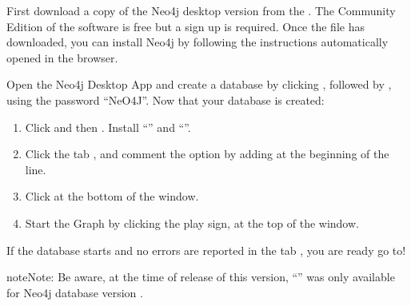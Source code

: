 \documentclass[letterpaper,10pt,english]{sphinxmanual}
\begin{document}
First download a copy of the Neo4j desktop version from the .
The Community Edition of the software is free but a sign up is required.
Once the file has downloaded, you can install Neo4j by following the instructions automatically opened in the browser.

\noindent{}

\noindent{}

\noindent{}

Open the Neo4j Desktop App and create a database by clicking , followed by , using the password “NeO4J”.
Now that your database is created:

\noindent{}

\noindent{}

\noindent{}
\begin{enumerate}
%
\item {} 
Click  and then . Install “” and “”.

\item {} 
Click the tab , and comment the option  by adding \sphinxcode{\sphinxupquote{\#}} at the beginning of the line.

\item {} 
Click  at the bottom of the window.

\item {} 
Start the Graph by clicking the play sign, at the top of the window.

\end{enumerate}

If the database starts and no errors are reported in the tab , you are ready go to!

\begin{sphinxadmonition}{note}{Note:}
Be aware, at the time of release of this version, “” was only available for Neo4j database version .
\end{sphinxadmonition}
\end{document}
